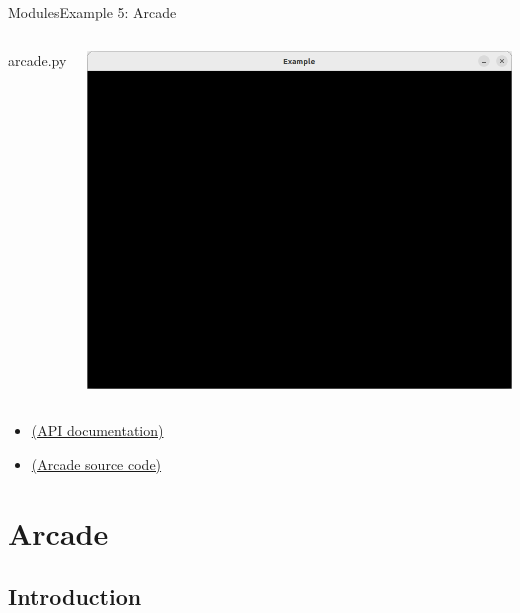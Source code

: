 \documentclass[10pt,compress]{beamer} %
\begin{document}
\begin{frame}{Modules}{Example 5: Arcade}
	\begin{columns}

		\vspace{-0.2cm}
		\begin{exampleblock}{arcade.py}
		\vspace{-0.2cm}
		
		\vspace{-0.2cm}
		\end{exampleblock}

		\vspace{-0.2cm}
		\centering \includegraphics[width=\linewidth]{figs/window.png}\\
		\vspace{-0.2cm}
	\end{columns}

	\begin{itemize}
		\item \href{https://api.arcade.academy/en/latest/arcade.html}{(API documentation)}
		\item \href{https://github.com/pythonarcade/arcade/tree/development}{(Arcade source code)}
	\end{itemize}
\end{frame}

\section{Arcade}
\subsection{Introduction}
\end{document}
